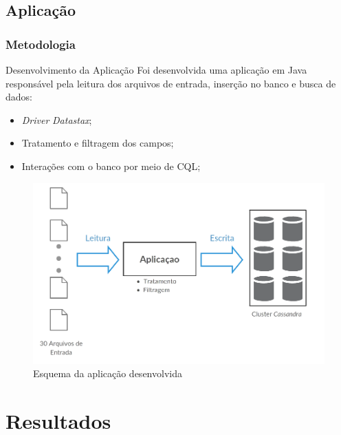 \documentclass[brazil]{beamer}
\begin{document}
\subsection{Aplicação}
\begin{frame}
	\frametitle{Metodologia}
	
	\begin{block}{Desenvolvimento da Aplicação}
		Foi desenvolvida uma aplicação em Java responsável pela leitura dos arquivos de entrada, inserção no banco e busca de dados:
		\begin{itemize}
			\item \emph{Driver} \emph{Datastax};
			\item Tratamento e filtragem dos campos;
			\item Interações com o banco por meio de CQL;
		\end{itemize}
	
		 \begin{figure}
			\includegraphics[width=0.7\linewidth]{figuras/aplicacao.png}
			\caption{Esquema da aplicação desenvolvida}
		\end{figure}
	\end{block}
\end{frame}

\section{Resultados}
\end{document}
